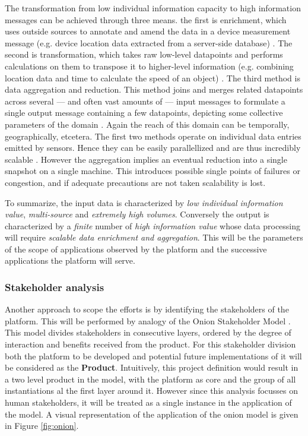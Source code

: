 The transformation from low individual information capacity to high information messages can be achieved through three means. the first is enrichment, which uses outside sources to annotate and amend the data in a device measurement message (e.g. device location data extracted from a server-side database) \cite{data_enrichment}. The second is transformation, which takes raw low-level datapoints and performs calculations on them to transpose it to higher-level information (e.g. combining location data and time to calculate the speed of an object) \cite{information_transformation}. The third method is data aggregation and reduction. This method joins and merges related datapoints across several --- and often vast amounts of --- input messages to formulate a single output message containing a few datapoints, depicting some collective parameters of the domain \cite{information_transformation}. Again the reach of this domain can be temporally, geographically, etcetera. The first two methods operate on individual data entries emitted by sensors. Hence they can be easily parallellized and are thus incredibly scalable \cite{data_mining_and_cleaning}. However the aggregation implies an eventual reduction into a single snapshot on a single machine. This introduces possible single points of failures or congestion, and if adequate precautions are not taken scalability is lost.

To summarize, the input data is characterized by \emph{low individual information value}, \emph{multi-source} and \emph{extremely high volumes}. Conversely the output is characterized by a \emph{finite} number of \emph{high information value} whose data processing will require \emph{scalable data enrichment and aggregation}. This will be the parameters of the scope of applications observed by the platform and the successive applications the platform will serve.

\subsubsection*{Stakeholder analysis}
Another approach to scope the efforts is by identifying the stakeholders of the platform. This will be performed by analogy of the Onion Stakeholder Model \cite{onion}. This model divides stakeholders in consecutive layers, ordered by the degree of interaction and benefits received from the product. For this stakeholder division both the platform to be developed and potential future implementations of it will be considered as the \textbf{Product}. Intuitively, this project definition would result in a two level product in the model, with the platform as core and the group of all instantiations al the first layer around it. However since this analysis focusses on human stakeholders, it will be treated as a single instance in the application of the model. A visual representation of the application of the onion model is given in Figure \ref{fig:onion}.


